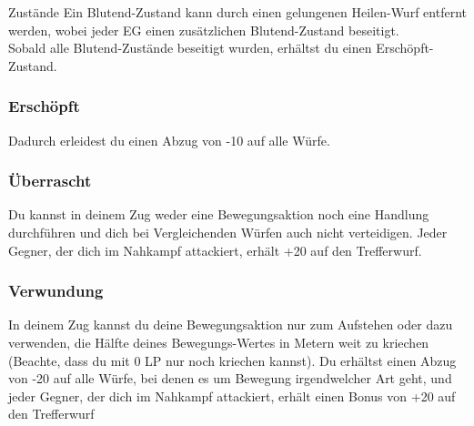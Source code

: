\documentclass{article}
\begin{document}
\begin{multicols*}{3}
\begin{slsframe}{Zustände}
        Ein Blutend-Zustand kann durch einen gelungenen Heilen-Wurf entfernt werden, wobei jeder EG einen zusätzlichen Blutend-Zustand beseitigt.\\
        
        Sobald alle Blutend-Zustände beseitigt wurden, erhältst du einen Erschöpft-Zustand.

        \subsubsection*{Erschöpft}
        Dadurch erleidest du einen Abzug von -10 auf alle Würfe.

        \subsubsection*{Überrascht}
        Du kannst in deinem Zug weder eine Bewegungsaktion noch eine Handlung durchführen und dich bei Vergleichenden Würfen auch nicht verteidigen. Jeder Gegner, der dich im Nahkampf attackiert, erhält +20 auf den Trefferwurf.

        \subsubsection*{Verwundung}
        In deinem Zug kannst du deine Bewegungsaktion nur zum Aufstehen oder dazu verwenden, die Hälfte deines Bewegungs-Wertes in Metern weit zu kriechen (Beachte, dass du mit 0 LP nur noch kriechen kannst). Du erhältst einen Abzug von -20 auf alle Würfe, bei denen es um Bewegung irgendwelcher Art geht, und jeder Gegner, der dich im Nahkampf attackiert, erhält einen Bonus von +20 auf den Trefferwurf
    \end{slsframe}

\end{multicols*}
\end{document}
